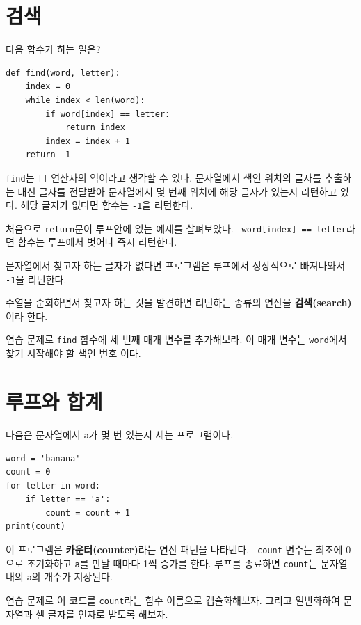 \documentclass[10pt]{book}
\begin{document}
\section{검색}
\label{find}

다음 함수가 하는 일은?

\begin{verbatim}
def find(word, letter):
    index = 0
    while index < len(word):
        if word[index] == letter:
            return index
        index = index + 1
    return -1
\end{verbatim}
%
{\tt find}는 {\tt []} 연산자의 역이라고 생각할 수 있다.  문자열에서
색인 위치의 글자를 추출하는 대신 글자를 전달받아 문자열에서 몇 번째
위치에 해당 글자가 있는지 리턴하고 있다.  해당 글자가 없다면 함수는
{\tt -1}을 리턴한다.

처음으로 {\tt return}문이 루프안에 있는 예제를 살펴보았다.  {\tt
  word[index] == letter}라면 함수는 루프에서 벗어나 즉시 리턴한다.

문자열에서 찾고자 하는 글자가 없다면 프로그램은 루프에서 정상적으로
빠져나와서 {\tt -1}을 리턴한다.

수열을 순회하면서 찾고자 하는 것을 발견하면 리턴하는 종류의 연산을
{\bf 검색(search)}이라 한다.

연습 문제로 {\tt find} 함수에 세 번째 매개 변수를 추가해보라.  이 매개
변수는 {\tt word}에서 찾기 시작해야 할 색인 번호 이다. 


\section{루프와 합계}
\label{counter}

다음은 문자열에서 {\tt a}가 몇 번 있는지 세는 프로그램이다. 

\begin{verbatim}
word = 'banana'
count = 0
for letter in word:
    if letter == 'a':
        count = count + 1
print(count)
\end{verbatim}
%
이 프로그램은 {\bf 카운터(counter)}라는 연산 패턴을 나타낸다.  {\tt
  count} 변수는 최초에 0으로 초기화하고 {\tt a}를 만날 때마다 1씩
증가를 한다.  루프를 종료하면 {\tt count}는 문자열 내의 {\tt a}의
개수가 저장된다.

 연습 문제로 이 코드를 {\tt count}라는 함수
이름으로 캡슐화해보자.  그리고 일반화하여 문자열과 셀 글자를 인자로
받도록 해보자.
\end{document}
